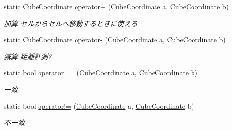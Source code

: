 \begin{DoxyCompactItemize}
static \mbox{\hyperlink{struct_hexagonal_map_1_1_domain_1_1_hex_map_1_1_cube_coordinate}{Cube\+Coordinate}} \mbox{\hyperlink{struct_hexagonal_map_1_1_domain_1_1_hex_map_1_1_cube_coordinate_aaf0a41b6167fe06325e5eab8b903c012}{operator+}} (\mbox{\hyperlink{struct_hexagonal_map_1_1_domain_1_1_hex_map_1_1_cube_coordinate}{Cube\+Coordinate}} a, \mbox{\hyperlink{struct_hexagonal_map_1_1_domain_1_1_hex_map_1_1_cube_coordinate}{Cube\+Coordinate}} b)
\begin{DoxyCompactList}\small\item\em 加算 セルからセルへ移動するときに使える \end{DoxyCompactList}\item 
static \mbox{\hyperlink{struct_hexagonal_map_1_1_domain_1_1_hex_map_1_1_cube_coordinate}{Cube\+Coordinate}} \mbox{\hyperlink{struct_hexagonal_map_1_1_domain_1_1_hex_map_1_1_cube_coordinate_ab94a6ae2126ec743ac77ba162df68966}{operator-\/}} (\mbox{\hyperlink{struct_hexagonal_map_1_1_domain_1_1_hex_map_1_1_cube_coordinate}{Cube\+Coordinate}} a, \mbox{\hyperlink{struct_hexagonal_map_1_1_domain_1_1_hex_map_1_1_cube_coordinate}{Cube\+Coordinate}} b)
\begin{DoxyCompactList}\small\item\em 減算 距離計測? \end{DoxyCompactList}\item 
static bool \mbox{\hyperlink{struct_hexagonal_map_1_1_domain_1_1_hex_map_1_1_cube_coordinate_a8906bffe7888dfbb2ffabc1b56cee434}{operator==}} (\mbox{\hyperlink{struct_hexagonal_map_1_1_domain_1_1_hex_map_1_1_cube_coordinate}{Cube\+Coordinate}} a, \mbox{\hyperlink{struct_hexagonal_map_1_1_domain_1_1_hex_map_1_1_cube_coordinate}{Cube\+Coordinate}} b)
\begin{DoxyCompactList}\small\item\em 一致 \end{DoxyCompactList}\item 
static bool \mbox{\hyperlink{struct_hexagonal_map_1_1_domain_1_1_hex_map_1_1_cube_coordinate_a5297a05c605745e289f070b325a3397d}{operator!=}} (\mbox{\hyperlink{struct_hexagonal_map_1_1_domain_1_1_hex_map_1_1_cube_coordinate}{Cube\+Coordinate}} a, \mbox{\hyperlink{struct_hexagonal_map_1_1_domain_1_1_hex_map_1_1_cube_coordinate}{Cube\+Coordinate}} b)
\begin{DoxyCompactList}\small\item\em 不一致 \end{DoxyCompactList}\end{DoxyCompactItemize}
